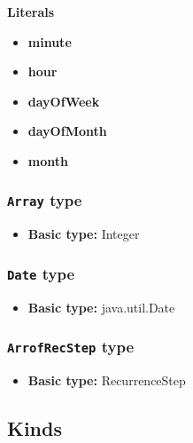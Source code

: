 \textbf{Literals}
\begin{itemize}
\item \textbf{minute} 
\end{itemize}
\begin{itemize}
\item \textbf{hour} 
\end{itemize}
\begin{itemize}
\item \textbf{dayOfWeek} 
\end{itemize}
\begin{itemize}
\item \textbf{dayOfMonth} 
\end{itemize}
\begin{itemize}
\item \textbf{month} 
\end{itemize}

\subsubsection{\texttt{Array} type}

\begin{itemize}
\item \textbf{Basic type:} Integer
\end{itemize}
\subsubsection{\texttt{Date} type}

\begin{itemize}
\item \textbf{Basic type:} java.util.Date
\end{itemize}
\subsubsection{\texttt{ArrofRecStep} type}

\begin{itemize}
\item \textbf{Basic type:} RecurrenceStep
\end{itemize}
\subsection{Kinds}
